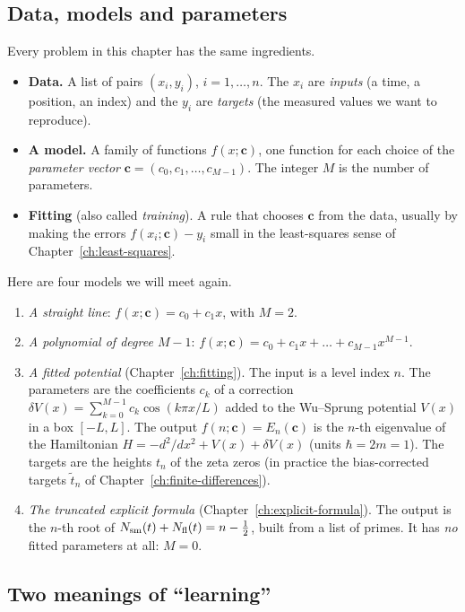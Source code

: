 \subsection{Data, models and parameters}

Every problem in this chapter has the same ingredients.

\begin{itemize}
\item \textbf{Data.} A list of pairs $(x_i,y_i)$, $i=1,\dots,n$. The $x_i$ are \emph{inputs} (a time, a position, an index) and the $y_i$ are \emph{targets} (the measured values we want to reproduce).
\item \textbf{A model.} A family of functions $f(x;\bm c)$, one function for each choice of the \emph{parameter vector} $\bm c=(c_0,c_1,\dots,c_{M-1})$. The integer $M$ is the number of parameters.
\item \textbf{Fitting} (also called \emph{training}). A rule that chooses $\bm c$ from the data, usually by making the errors $f(x_i;\bm c)-y_i$ small in the least-squares sense of Chapter~\ref{ch:least-squares}.
\end{itemize}

Here are four models we will meet again.

\begin{enumerate}
\item \emph{A straight line}: $f(x;\bm c)=c_0+c_1x$, with $M=2$.
\item \emph{A polynomial of degree $M-1$}: $f(x;\bm c)=c_0+c_1x+\dots+c_{M-1}x^{M-1}$.
\item \emph{A fitted potential} (Chapter~\ref{ch:fitting}). The input is a level index $n$. The parameters are the coefficients $c_k$ of a correction $\delta V(x)=\sum_{k=0}^{M-1}c_k\cos(k\pi x/L)$ added to the Wu--Sprung potential $V(x)$ in a box $[-L,L]$. The output $f(n;\bm c)=E_n(\bm c)$ is the $n$-th eigenvalue of the Hamiltonian $H=-d^2/dx^2+V(x)+\delta V(x)$ (units $\hbar=2m=1$). The targets are the heights $t_n$ of the zeta zeros (in practice the bias-corrected targets $\tilde t_n$ of Chapter~\ref{ch:finite-differences}).
\item \emph{The truncated explicit formula} (Chapter~\ref{ch:explicit-formula}). The output is the $n$-th root of $N_{\mathrm{sm}}(t)+N_{\mathrm{fl}}(t)=n-\tfrac12$, built from a list of primes. It has \emph{no} fitted parameters at all: $M=0$.
\end{enumerate}

\subsection{Two meanings of ``learning''}

